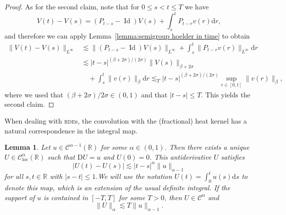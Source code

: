 \documentclass[a4paper,11pt]{article}
\newcommand{\mathD}{\mathrm{D}}
\newcommand{\mathd}{\mathrm{d}}
\newcommand{\tmop}[1]{\ensuremath{\operatorname{#1}}}
\newtheorem{lemma}[theorem]{Lemma}
\theoremstyle{remark}
\newcommand{\CC}{\ensuremath{\mathscr{C}}}
\begin{document}
\begin{proof}
  As for the second claim, note that for $0 \leqslant s<t \leqslant T$ we have
  \[
      V ( t ) -V ( s ) = ( P_{t-s} - \tmop{Id} ) V ( s ) + \int_{s}^{t} P_{t-r} v ( r ) \mathd r,
  \]
  and therefore we can apply Lemma~\ref{lemma:semigroup hoelder in time} to obtain
  \begin{align*}
     \| V ( t ) -V ( s ) \|_{L^{\infty}} & \lesssim \| ( P_{t-s} - \tmop{Id} ) V( s ) \|_{L^{\infty}} + \int_{s}^{t} \| P_{t-r} v ( r ) \|_{L^{\infty}} \mathd r \\
     & \lesssim | t-s |^{( \beta +2\sigma ) / ( 2 \sigma )} \| V ( s ) \|_{\beta +2\sigma} \\
     &\quad +  \int_{s}^{t} \| v ( r ) \|_{\beta} \mathd r \lesssim_{T} | t-s |^{( \beta +2\sigma ) / ( 2 \sigma )} \sup_{r \in [ 0,t ]} \| v ( r ) \|_{\beta} ,
  \end{align*}
  where we used that $( \beta +2\sigma )/2\sigma \in ( 0,1 )$ and that $| t-s | \leqslant T$. This yields the second claim.
\end{proof}

When dealing with \textsc{rde}s, the convolution with the (fractional) heat kernel has a natural correspondence in the integral map.

\begin{lemma}\label{lemma:integral}
  Let $u \in \CC^{\alpha -1} ( \mathbb{R} )$ for some $\alpha \in ( 0,1 )$. Then there exists a unique $U \in \CC^{\alpha}_{\tmop{loc}} ( \mathbb{R} )$ such that $\mathD U=u$ and $U ( 0
  ) =0$. This antiderivative $U$ satisfies
  \begin{equation}\label{eq:integral estimate 1}
     | U ( t ) -U ( s ) | \lesssim | t-s |^{\alpha} \| u \|_{\alpha -1}
  \end{equation}
  for all $s,t \in \mathbb{R}$ with $| s-t | \leqslant 1$.We will use the notation $U ( t ) = \int_{0}^{t} u ( s ) \mathd s$ to denote this map, which is an extension of the usual definite integral. If the support of $u$ is contained in $[ -T,T ]$ for some $T>0$, then $U \in \CC^{\alpha}$ and
  \[
     \| U \|_{\alpha} \lesssim T \| u \|_{\alpha -1}.
  \]
\end{lemma}
\end{document}
